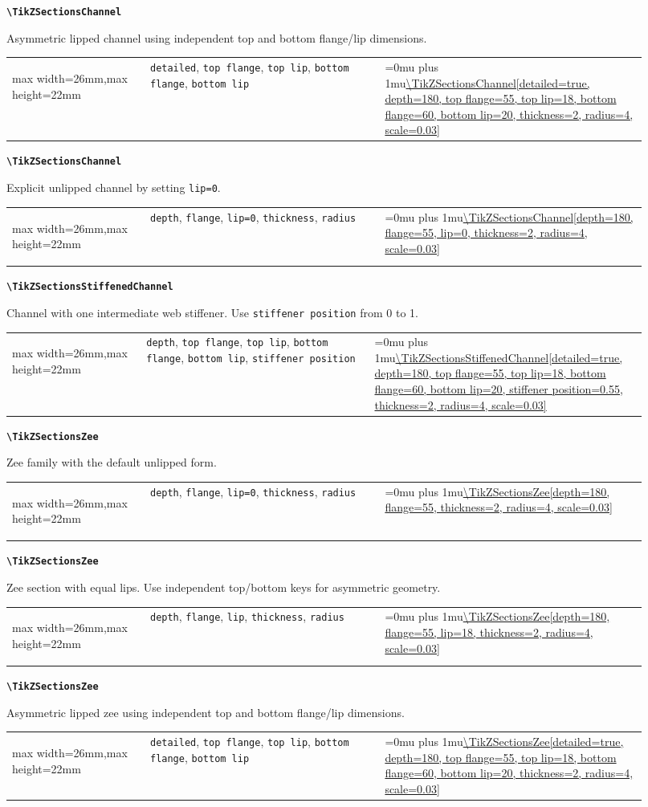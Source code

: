 \documentclass[10pt]{article}
\makeatletter
\newcommand{\command}[1]{\texttt{\textbackslash #1}}
\newcommand{\keyname}[1]{\texttt{#1}}
\newcommand{\CodeInline}[1]{%
  \begingroup
  \ttfamily\scriptsize\raggedright\Urlmuskip=0mu plus 1mu\url{#1}%
  \endgroup
}
\newcommand{\ShapePreview}[1]{%
  \begin{center}
  \begin{adjustbox}{max width=26mm,max height=22mm}
    \begin{tikzpicture}
      #1
    \end{tikzpicture}
  \end{adjustbox}
  \end{center}
}
\newcommand{\ReferenceRow}[6]{%
  \textbf{\command{#1}}\par
  #2\par
  \vspace{2pt}
  \begin{tabular}{@{}p{0.20\linewidth}p{0.34\linewidth}p{0.38\linewidth}@{}}
    #6 & \footnotesize #3 & \CodeInline{#4}
  \end{tabular}
  \par\vspace{4mm}
}
\makeatother
\begin{document}
\ReferenceRow
  {TikZSectionsChannel}
  {Asymmetric lipped channel using independent top and bottom flange/lip dimensions.}
  {\keyname{detailed}, \keyname{top flange}, \keyname{top lip}, \keyname{bottom flange}, \keyname{bottom lip}}
  {\TikZSectionsChannel[detailed=true, depth=180, top flange=55, top lip=18, bottom flange=60, bottom lip=20, thickness=2, radius=4, scale=0.03]}
  {}
  {\ShapePreview{\TikZSectionsChannel[detailed=true, depth=180, top flange=55, top lip=18, bottom flange=60, bottom lip=20, thickness=2, radius=4, scale=0.03]}}

\ReferenceRow
  {TikZSectionsChannel}
  {Explicit unlipped channel by setting \keyname{lip=0}.}
  {\keyname{depth}, \keyname{flange}, \keyname{lip=0}, \keyname{thickness}, \keyname{radius}}
  {\TikZSectionsChannel[depth=180, flange=55, lip=0, thickness=2, radius=4, scale=0.03]}
  {}
  {\ShapePreview{\TikZSectionsChannel[depth=180, flange=55, lip=0, thickness=2, radius=4, scale=0.03]}}

\ReferenceRow
  {TikZSectionsStiffenedChannel}
  {Channel with one intermediate web stiffener. Use \keyname{stiffener position} from 0 to 1.}
  {\keyname{depth}, \keyname{top flange}, \keyname{top lip}, \keyname{bottom flange}, \keyname{bottom lip}, \keyname{stiffener position}}
  {\TikZSectionsStiffenedChannel[detailed=true, depth=180, top flange=55, top lip=18, bottom flange=60, bottom lip=20, stiffener position=0.55, thickness=2, radius=4, scale=0.03]}
  {}
  {\ShapePreview{\TikZSectionsStiffenedChannel[detailed=true, depth=180, top flange=55, top lip=18, bottom flange=60, bottom lip=20, stiffener position=0.55, thickness=2, radius=4, scale=0.03]}}

\ReferenceRow
  {TikZSectionsZee}
  {Zee family with the default unlipped form.}
  {\keyname{depth}, \keyname{flange}, \keyname{lip=0}, \keyname{thickness}, \keyname{radius}}
  {\TikZSectionsZee[depth=180, flange=55, thickness=2, radius=4, scale=0.03]}
  {}
  {\ShapePreview{\TikZSectionsZee[depth=180, flange=55, thickness=2, radius=4, scale=0.03]}}

\ReferenceRow
  {TikZSectionsZee}
  {Zee section with equal lips. Use independent top/bottom keys for asymmetric geometry.}
  {\keyname{depth}, \keyname{flange}, \keyname{lip}, \keyname{thickness}, \keyname{radius}}
  {\TikZSectionsZee[depth=180, flange=55, lip=18, thickness=2, radius=4, scale=0.03]}
  {}
  {\ShapePreview{\TikZSectionsZee[depth=180, flange=55, lip=18, thickness=2, radius=4, scale=0.03]}}

\ReferenceRow
  {TikZSectionsZee}
  {Asymmetric lipped zee using independent top and bottom flange/lip dimensions.}
  {\keyname{detailed}, \keyname{top flange}, \keyname{top lip}, \keyname{bottom flange}, \keyname{bottom lip}}
  {\TikZSectionsZee[detailed=true, depth=180, top flange=55, top lip=18, bottom flange=60, bottom lip=20, thickness=2, radius=4, scale=0.03]}
  {}
  {\ShapePreview{\TikZSectionsZee[detailed=true, depth=180, top flange=55, top lip=18, bottom flange=60, bottom lip=20, thickness=2, radius=4, scale=0.03]}}
\end{document}
